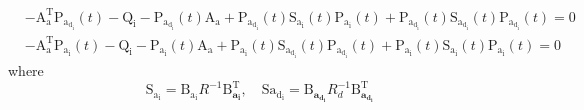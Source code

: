 \documentclass[preprint,12pt,authoryear]{elsarticle}
\begin{document}
\begin{align}\label{coupled_riccatti_LQIDG}
	&-\boldsymbol{\mathrm{A^\mathrm{T}_a}}\boldsymbol{\mathrm{P_{a_{d_i}}}}(t)
	 - \boldsymbol{\mathrm{Q_{i}}} - \boldsymbol{\mathrm{P_{a_{d_i}}}}(t)\boldsymbol{\mathrm{A_a}} 
	 + \boldsymbol{\mathrm{P_{a_{d_i}}}}(t)\boldsymbol{\mathrm{S_{a_i}}}(t)\boldsymbol{\mathrm{P_{a_i}}}(t)
	  +\boldsymbol{\mathrm{P_{a_{d_i}}}}(t)\boldsymbol{\mathrm{S_{a_{d_i}}}}(t)\boldsymbol{\mathrm{P_{a_{d_i}}}}(t)
	=\boldsymbol{\mathrm{0}}\\
            &-\boldsymbol{\mathrm{A^\mathrm{T}_a}}\boldsymbol{\mathrm{P_{a_i}}}(t) - \boldsymbol{\mathrm{Q_i}}
			 - \boldsymbol{\mathrm{P_{a_i}}}(t)\boldsymbol{\mathrm{A_a}}  +
			  \boldsymbol{\mathrm{P_{a_i}}}(t)\boldsymbol{\mathrm{S_{a_{d_i}}}}(t)\boldsymbol{\mathrm{P_{a_{d_i}}}}(t) 
			  +\boldsymbol{\mathrm{P_{a_i}}}(t)\boldsymbol{\mathrm{S_{a_i}}}(t)\boldsymbol{\mathrm{P_{a_i}}}(t) =\boldsymbol{\mathrm{0}}
\end{align}
where $$
	\boldsymbol{\mathrm{S_{a_i}}} = \boldsymbol{\mathrm{B_{a_i}}}R^{-1}\boldsymbol{\mathrm{B}^\mathrm{T}_{a_i}}, \quad
	\boldsymbol{\mathrm{S{a_{d_i}}}} = \boldsymbol{\mathrm{B}_{a_{d_i}}}R_{d}^{-1}\boldsymbol{\mathrm{B}^\mathrm{T}_{a_{d_i}}}
$$ %
\end{document}
